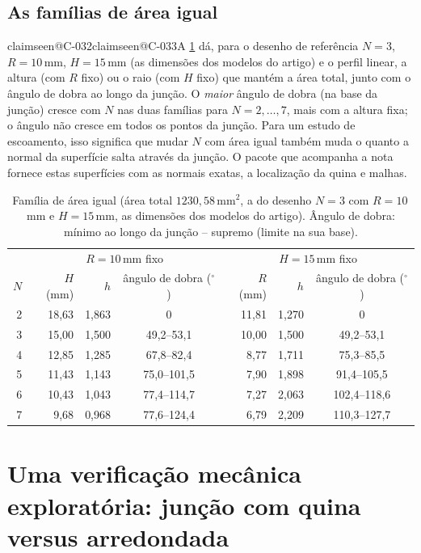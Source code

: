 \documentclass[11pt,a4paper]{article}
\makeatletter
\theoremstyle{plain}
\theoremstyle{remark}
\newcommand{\claim}[1]{\ifcsname claimseen@#1\endcsname\else\expandafter\gdef\csname claimseen@#1\endcsname{}\label{claim:#1}\fi}
\makeatother
\begin{document}
\subsection{As famílias de área igual}
\claim{C-032}\claim{C-033}A \cref{tab:gn} dá, para o desenho de referência $N=3$, $R=10$\,mm, $H=15$\,mm (as dimensões dos
modelos do artigo) e o perfil linear, a altura (com $R$ fixo) ou o raio (com $H$ fixo) que mantém a área total, junto com o
ângulo de dobra ao longo da junção. O \emph{maior} ângulo de dobra (na base da junção) cresce com $N$ nas duas famílias para
$N=2,\dots,7$, mais com a altura fixa; o ângulo não cresce em todos os pontos da junção. Para um estudo de escoamento, isso
significa que mudar $N$ com área igual também muda o quanto a normal da superfície salta através da junção. O pacote que
acompanha a nota fornece estas superfícies com as normais exatas, a localização da quina e malhas.

\begin{table}[t]\centering\small
\begin{tabular}{r|rrc|rrc}\toprule
 & \multicolumn{3}{c|}{$R=10$\,mm fixo} & \multicolumn{3}{c}{$H=15$\,mm fixo}\\
$N$ & $H$ (mm) & $h$ & ângulo de dobra ($^\circ$) & $R$ (mm) & $h$ & ângulo de dobra ($^\circ$)\\\midrule
2 & 18,63 & 1,863 & 0 & 11,81 & 1,270 & 0\\
3 & 15,00 & 1,500 & 49,2--53,1 & 10,00 & 1,500 & 49,2--53,1\\
4 & 12,85 & 1,285 & 67,8--82,4 & 8,77 & 1,711 & 75,3--85,5\\
5 & 11,43 & 1,143 & 75,0--101,5 & 7,90 & 1,898 & 91,4--105,5\\
6 & 10,43 & 1,043 & 77,4--114,7 & 7,27 & 2,063 & 102,4--118,6\\
7 & 9,68 & 0,968 & 77,6--124,4 & 6,79 & 2,209 & 110,3--127,7\\
\bottomrule
\end{tabular}
\caption{Família de área igual (área total $1230{,}58$\,mm$^2$, a do desenho $N=3$ com $R=10$\,mm e $H=15$\,mm, as dimensões
dos modelos do artigo). Ângulo de dobra: mínimo ao longo da junção -- supremo (limite na sua base).}
\label{tab:gn}
\end{table}

\section{Uma verificação mecânica exploratória: junção com quina versus arredondada}\label{sec:fem}
\end{document}
